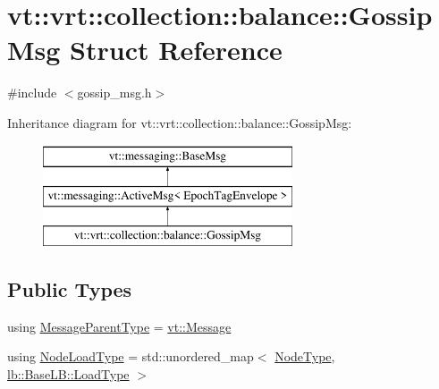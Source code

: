 \hypertarget{structvt_1_1vrt_1_1collection_1_1balance_1_1_gossip_msg}{}\section{vt\+:\+:vrt\+:\+:collection\+:\+:balance\+:\+:Gossip\+Msg Struct Reference}
\label{structvt_1_1vrt_1_1collection_1_1balance_1_1_gossip_msg}


{\ttfamily \#include $<$gossip\+\_\+msg.\+h$>$}

Inheritance diagram for vt\+:\+:vrt\+:\+:collection\+:\+:balance\+:\+:Gossip\+Msg\+:\begin{figure}[H]
\begin{center}
\leavevmode
\includegraphics[height=3.000000cm]{structvt_1_1vrt_1_1collection_1_1balance_1_1_gossip_msg}
\end{center}
\end{figure}
\subsection*{Public Types}
\begin{DoxyCompactItemize}
\item 
using \hyperlink{structvt_1_1vrt_1_1collection_1_1balance_1_1_gossip_msg_a640e492438ba6fd6c8affa25ed0f17fc}{Message\+Parent\+Type} = \hyperlink{namespacevt_a3a3ddfef40b4c90915fa43cdd5f129ea}{vt\+::\+Message}
\item 
using \hyperlink{structvt_1_1vrt_1_1collection_1_1balance_1_1_gossip_msg_a8deef056cb137cfd67540a31be189122}{Node\+Load\+Type} = std\+::unordered\+\_\+map$<$ \hyperlink{namespacevt_a866da9d0efc19c0a1ce79e9e492f47e2}{Node\+Type}, \hyperlink{structvt_1_1vrt_1_1collection_1_1lb_1_1_base_l_b_a215e22b9f12678303f49615ae3be05cc}{lb\+::\+Base\+L\+B\+::\+Load\+Type} $>$
\end{DoxyCompactItemize}
